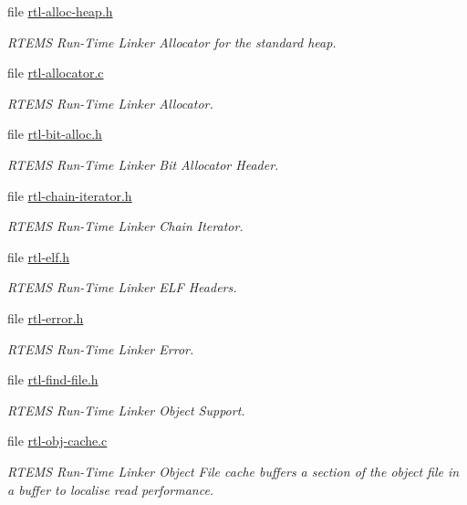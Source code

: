 \begin{DoxyCompactItemize}
file \mbox{\hyperlink{rtl-alloc-heap_8h}{rtl-\/alloc-\/heap.\+h}}
\begin{DoxyCompactList}\small\item\em R\+T\+E\+MS Run-\/\+Time Linker Allocator for the standard heap. \end{DoxyCompactList}\item 
file \mbox{\hyperlink{rtl-allocator_8c}{rtl-\/allocator.\+c}}
\begin{DoxyCompactList}\small\item\em R\+T\+E\+MS Run-\/\+Time Linker Allocator. \end{DoxyCompactList}\item 
file \mbox{\hyperlink{rtl-bit-alloc_8h}{rtl-\/bit-\/alloc.\+h}}
\begin{DoxyCompactList}\small\item\em R\+T\+E\+MS Run-\/\+Time Linker Bit Allocator Header. \end{DoxyCompactList}\item 
file \mbox{\hyperlink{rtl-chain-iterator_8h}{rtl-\/chain-\/iterator.\+h}}
\begin{DoxyCompactList}\small\item\em R\+T\+E\+MS Run-\/\+Time Linker Chain Iterator. \end{DoxyCompactList}\item 
file \mbox{\hyperlink{rtl-elf_8h}{rtl-\/elf.\+h}}
\begin{DoxyCompactList}\small\item\em R\+T\+E\+MS Run-\/\+Time Linker E\+LF Headers. \end{DoxyCompactList}\item 
file \mbox{\hyperlink{rtl-error_8h}{rtl-\/error.\+h}}
\begin{DoxyCompactList}\small\item\em R\+T\+E\+MS Run-\/\+Time Linker Error. \end{DoxyCompactList}\item 
file \mbox{\hyperlink{rtl-find-file_8h}{rtl-\/find-\/file.\+h}}
\begin{DoxyCompactList}\small\item\em R\+T\+E\+MS Run-\/\+Time Linker Object Support. \end{DoxyCompactList}\item 
file \mbox{\hyperlink{rtl-obj-cache_8c}{rtl-\/obj-\/cache.\+c}}
\begin{DoxyCompactList}\small\item\em R\+T\+E\+MS Run-\/\+Time Linker Object File cache buffers a section of the object file in a buffer to localise read performance. \end{DoxyCompactList}\item 

\end{DoxyCompactItemize}
